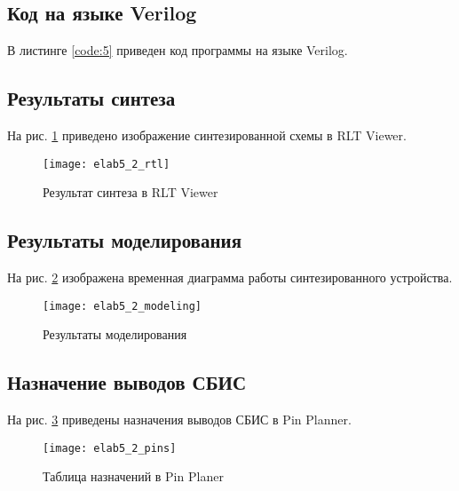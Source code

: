 \subsection{Код на языке Verilog}

В листинге \ref{code:5} приведен код программы на языке Verilog.



\subsection{Результаты синтеза}

На рис. \ref{fig:elab5_2_rtl} приведено изображение синтезированной схемы в RLT Viewer.

\begin{figure}[H]
\begin{center}
	\texttt{[image: elab5\_2\_rtl]}
	\caption{Результат синтеза в RLT Viewer}
	\label{fig:elab5_2_rtl}
\end{center}
\end{figure}

\subsection{Результаты моделирования}
\label{sec:elab5_2_modeling}

На рис. \ref{fig:elab5_2_modeling} изображена временная диаграмма работы синтезированного устройства. 

\begin{figure}[H]
\begin{center}
	\texttt{[image: elab5\_2\_modeling]}
	\caption{Результаты моделирования}
	\label{fig:elab5_2_modeling}
\end{center}
\end{figure}

\newpage

\subsection{Назначение выводов СБИС}

На рис. \ref{fig:elab5_2_pins} приведены назначения выводов СБИС в Pin Planner.

\begin{figure}[H]
\begin{center}
	\texttt{[image: elab5\_2\_pins]}
	\caption{Таблица назначений в Pin Planer}
	\label{fig:elab5_2_pins}
\end{center}
\end{figure}

